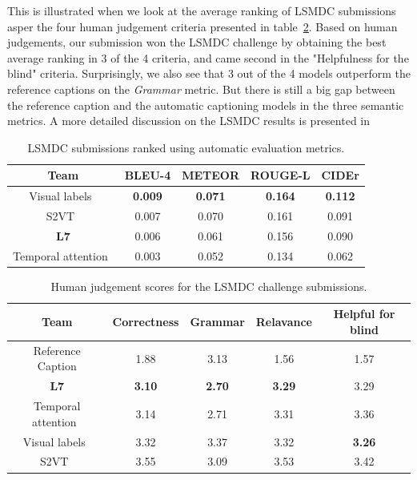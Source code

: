 This is illustrated when we look at the average ranking of LSMDC submissions
asper the four human judgement criteria presented in
table~\ref{tab:resLsmdcTestHum}.
Based on human judgements, our submission won the LSMDC challenge by obtaining
the best average ranking in 3 of the 4 criteria, and came second in the
"Helpfulness for the blind" criteria.
Surprisingly, we also see that 3 out of the 4 models outperform the reference
captions on the \emph{Grammar} metric.
But there is still a big gap between the reference caption and the automatic
captioning models in the three semantic metrics.
A more detailed discussion on the LSMDC results is presented
in~\cite{DBLP:journals/corr/RohrbachTRTPLCS16}

\begin{table}[th]
  \centering
  \newcommand{\bs}{\small\bf}
  \begin{adjustbox}{center}
  \begin{tabular}{||c|c|c|c|c|}
    \hline\hline
    \bf Team  &\bs BLEU-4 &\bs METEOR &\bs ROUGE-L &\bs CIDEr \\\hline\hline
    Visual labels~\cite{rohrbach2015long} &\bf0.009&\bf0.071&\bf0.164&\bf0.112\\
    S2VT~\cite{venugopalan2015sequence} & 0.007 & 0.070 & 0.161 & 0.091\\
    \bf L7               & 0.006 & 0.061 & 0.156 & 0.090\\
    Temporal attention~\cite{yao2015describing} & 0.003 & 0.052 & 0.134 & 0.062\\\hline
    \hline
  \end{tabular}
  \end{adjustbox}
  \caption{LSMDC submissions ranked using automatic evaluation metrics.}
  \label{tab:resLsmdcTestMet}
\end{table}

\begin{table}[th]
  \centering
  \newcommand{\bs}{\small\bf}
  \begin{adjustbox}{center}
  \begin{tabular}{||c|c|c|c|c|}
    \hline\hline
    \bf Team  &\bs Correctness &\bs Grammar &\bs Relavance & \bf Helpful for blind\\\hline\hline
    Reference Caption    & 1.88  & 3.13  & 1.56  & 1.57\\\hline
    \bf L7               &\bf3.10&\bf2.70&\bf3.29&3.29\\
    Temporal attention~\cite{yao2015describing} & 3.14  & 2.71  & 3.31  & 3.36\\
    Visual labels~\cite{rohrbach2015long}& 3.32  & 3.37  & 3.32  &\bf3.26\\
    S2VT~\cite{venugopalan2015sequence}& 3.55  & 3.09  & 3.53  & 3.42\\
    \hline
  \end{tabular}
  \end{adjustbox}
  \caption{Human judgement scores for the LSMDC challenge submissions.}
  \label{tab:resLsmdcTestHum}
\end{table}

